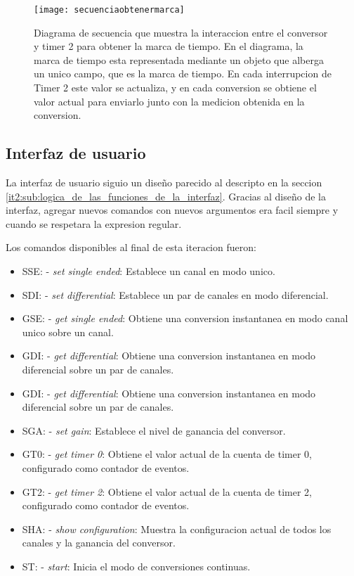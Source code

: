 \begin{figure}[h]
  \centering
  \texttt{[image: secuenciaobtenermarca]}
  \caption[Diagrama de secuencia para la obtencion de una marca de tiempo]{Diagrama de secuencia que muestra la interaccion entre el conversor y timer 2 para obtener la marca de tiempo. En el diagrama, la marca de tiempo esta representada mediante un objeto que alberga un unico campo, que es la marca de tiempo. En cada interrupcion de Timer 2 este valor se actualiza, y en cada conversion se obtiene el valor actual para enviarlo junto con la medicion obtenida en la conversion.}\label{it5:fig:secuenciaobtenermarca}
\end{figure}



\subsection{Interfaz de usuario} %
\label{it5:sub:interfaz_de_usuario}

La interfaz de usuario siguio un diseño parecido al descripto en la seccion \ref{it2:sub:logica_de_las_funciones_de_la_interfaz}. Gracias al diseño de la interfaz, agregar nuevos comandos con nuevos argumentos era facil siempre y cuando se respetara la expresion regular.

Los comandos disponibles al final de esta iteracion fueron:

\begin{itemize}
  \item SSE: - \textit{set single ended}: Establece un canal en modo unico.
  \item SDI: - \textit{set differential}: Establece un par de canales en modo diferencial.
  \item GSE: - \textit{get single ended}: Obtiene una conversion instantanea en modo canal unico sobre un canal.
  \item GDI: - \textit{get differential}: Obtiene una conversion instantanea en modo diferencial sobre un par de canales.
  \item GDI: - \textit{get differential}: Obtiene una conversion instantanea en modo diferencial sobre un par de canales.
  \item SGA: - \textit{set gain}: Establece el nivel de ganancia del conversor.
  \item GT0: - \textit{get timer 0}: Obtiene el valor actual de la cuenta de timer 0, configurado como contador de eventos.
  \item GT2: - \textit{get timer 2}: Obtiene el valor actual de la cuenta de timer 2, configurado como contador de eventos.
  \item SHA: - \textit{show configuration}: Muestra la configuracion actual de todos los canales y la ganancia del conversor.
  \item ST: - \textit{start}: Inicia el modo de conversiones continuas.
\end{itemize}

